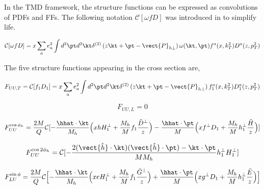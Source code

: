 In the TMD framework, the structure functions can be expressed as convolutions of PDFs and FFs.  The following notation $\mathcal{C}[\omega f D]$ was introduced in \cite{tmds-bacchetta:2006} to simplify life.

\begin{equation}
  \mathcal{C}[\omega f D] = x \sum_{a} e^{2}_{a} \int d^{2}\pt d^{2}\kt \delta^{(2)} \left( z\kt + \pt - \vect{P}_{h\perp} \right) \omega (\kt, \pt) f^{a}(x, k_{T}^{2}) D^{a}(z, p_{T}^{2}) 
\end{equation}

The five structure functions appearing in the cross section are, 

\begin{equation}
F_{UU,T} = \mathcal{C}[f_1 D_1] = x \sum_{a} e^{2}_{a} \int d^{2} \pt d^{2} \kt \delta^{(2)} \left( z\kt + \pt - \vect{P}_{h\perp} \right) f_{1}^{a}(x, k_{T}^{2}) D_{1}^{a}(z, p_{T}^{2})
\end{equation}

\begin{equation}
F_{UU,L} = 0
\end{equation}

\begin{equation}
F_{UU}^{\cos \phi_h} = \frac{2M}{Q} \mathcal{C}[ - \frac{\hhat \cdot \kt}{M_h} \Bigl( x h H_{1}^{\perp} + \frac{M_h}{M} f_1 \frac{\tilde{D}^{\perp}}{z} \Bigr) - \frac{\hhat \cdot \pt}{M} \Bigl( x f^{\perp} D_1 + \frac{M_h}{M} h_1^{\perp} \frac{\tilde{H}}{z} \Bigr)]
\end{equation}

\begin{equation}
F_{UU}^{\cos 2\phi_h} = \mathcal{C}[- \frac{2 (\vect{\hat{h}} \cdot \kt) (\vect{\hat{h}} \cdot \pt) - \kt \cdot \pt}{M M_h} h_{1}^{\perp} H_{1}^{\perp} ]
\end{equation}

\begin{equation}
  F_{LU}^{\sin\phi} = \frac{2M}{Q} \mathcal{C} \Bigl[ -\frac{\hhat \cdot \kt}{M_h} \Bigl( xeH_1^\perp + \frac{M_h}{M} f_1 \frac{\tilde{G}^\perp}{z} \Bigr) + \frac{\hhat \cdot \pt}{M} \Bigl( xg^\perp D_1 + \frac{M_h}{M} h_{1}^{\perp} \frac{\tilde{E}}{z} \Bigr) \Bigr]
\end{equation}

